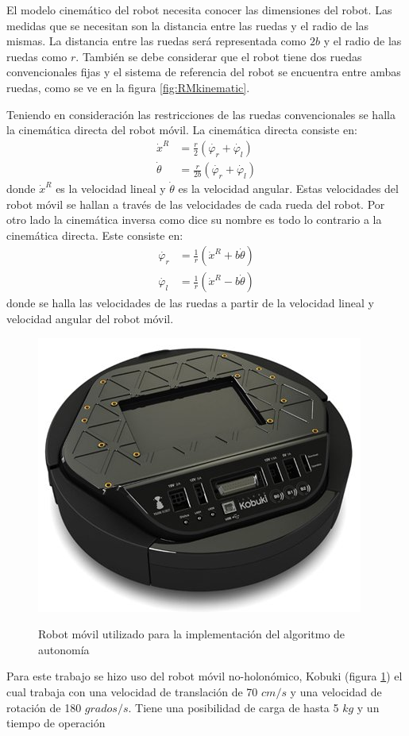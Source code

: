 El modelo cinem\'atico del robot necesita conocer las dimensiones del robot. Las 
medidas que se necesitan son la distancia entre las ruedas y el radio de las 
mismas. La distancia entre las ruedas ser\'a representada como $2b$ y el radio de 
las ruedas como $r$. Tambi\'en se debe considerar que el robot tiene dos ruedas 
convencionales fijas y el sistema de referencia del robot se encuentra entre 
ambas ruedas, como se ve en la figura \ref{fig:RMkinematic}.

Teniendo en consideración las restricciones de las ruedas convencionales se halla la cinemática 
directa del robot móvil. La cinemática directa consiste en:
\begin{align*}
\dot{x}^{R} &= \frac{r}{2}(\dot{\varphi_{r}} + \dot{\varphi_{l}}) \\
\dot{\theta} &= \frac{r}{2b}(\dot{\varphi_{r}} + \dot{\varphi_{l}})
\end{align*}
donde $\dot{x}^{R}$ es la velocidad lineal y $\dot{\theta}$ es la velocidad angular. Estas 
velocidades del robot móvil se hallan a 
través de las velocidades de cada rueda del robot. Por otro lado la cinemática inversa 
como dice su nombre es todo lo contrario a la cinemática directa. Este consiste en:
\begin{align*}
\dot{\varphi_{r}} &= \frac{1}{r}(\dot{x}^{R} + b\dot{\theta}) \\
\dot{\varphi_{l}} &= \frac{1}{r}(\dot{x}^{R} - b\dot{\theta})
\end{align*}
donde se halla las velocidades de las ruedas a partir de la velocidad lineal y velocidad
angular del robot móvil.
\begin{figure}%
 \centering \footnotesize
 {\includegraphics[width=0.35\linewidth]{images/kobuki.jpg}}
 \captionsetup{font=footnotesize}
 \caption{Robot m\'ovil utilizado para la implementación del algoritmo 
 de autonom\'ia}
 \label{fig:kobuki}
 \end{figure}
Para este trabajo se hizo uso del robot m\'ovil no-holon\'omico, Kobuki (figura \ref{fig:kobuki})
el cual trabaja con una velocidad de translaci\'on de 70 $cm/s$ y una velocidad de rotaci\'on 
de 180 $grados/s$. Tiene una posibilidad de carga de hasta 5 $kg$ y un tiempo de operaci\'on 
